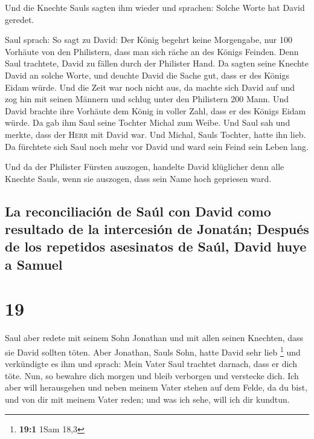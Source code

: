 Und die Knechte Sauls sagten ihm wieder und sprachen:
Solche Worte hat David geredet.

 Saul sprach: So sagt zu David: Der König begehrt keine
Morgengabe, nur 100 Vorhäute von den Philistern, dass man sich räche an
des Königs Feinden. Denn Saul trachtete, David zu fällen durch der
Philister Hand.  Da sagten seine Knechte David an solche
Worte, und deuchte David die Sache gut, dass er des Königs Eidam würde.
Und die Zeit war noch nicht aus,  da machte sich David
auf und zog hin mit seinen Männern und schlug unter den Philistern 200
Mann. Und David brachte ihre Vorhäute dem König in voller Zahl, dass er
des Königs Eidam würde. Da gab ihm Saul seine Tochter Michal zum Weibe.
 Und Saul sah und merkte, dass der \textsc{Herr} mit
David war. Und Michal, Sauls Tochter, hatte ihn lieb.  Da
fürchtete sich Saul noch mehr vor David und ward sein Feind sein Leben
lang.

 Und da der Philister Fürsten auszogen, handelte David
klüglicher denn alle Knechte Sauls, wenn sie auszogen, dass sein Name
hoch gepriesen ward.

\hypertarget{la-reconciliaciuxf3n-de-sauxfal-con-david-como-resultado-de-la-intercesiuxf3n-de-jonatuxe1n-despuuxe9s-de-los-repetidos-asesinatos-de-sauxfal-david-huye-a-samuel}{%
\subsection{La reconciliación de Saúl con David como resultado de la
intercesión de Jonatán; Después de los repetidos asesinatos de Saúl,
David huye a
Samuel}\label{la-reconciliaciuxf3n-de-sauxfal-con-david-como-resultado-de-la-intercesiuxf3n-de-jonatuxe1n-despuuxe9s-de-los-repetidos-asesinatos-de-sauxfal-david-huye-a-samuel}}

\hypertarget{section-18}{%
\section{19}\label{section-18}}

 Saul aber redete mit seinem Sohn Jonathan und mit allen
seinen Knechten, dass sie David sollten töten. Aber Jonathan, Sauls
Sohn, hatte David sehr lieb \footnote{\textbf{19:1} 1Sam 18,3}
 und verkündigte es ihm und sprach: Mein Vater Saul
trachtet darnach, dass er dich töte. Nun, so bewahre dich morgen und
bleib verborgen und verstecke dich.  Ich aber will
herausgehen und neben meinem Vater stehen auf dem Felde, da du bist, und
von dir mit meinem Vater reden; und was ich sehe, will ich dir kundtun.


